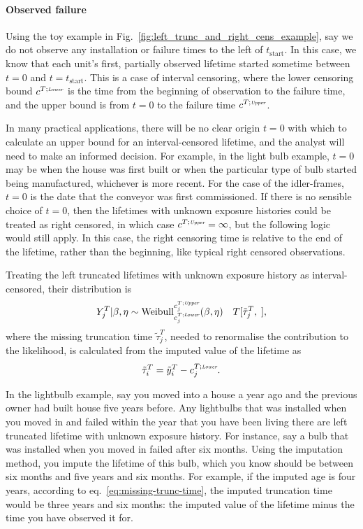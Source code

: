 \paragraph*{Observed failure}
Using the toy example in Fig.~\ref{fig:left_trunc_and_right_cens_example}, say we do not observe any installation or failure times to the left of $t_\text{start}$. In this case, we know that each unit's first, partially observed lifetime started sometime between $t = 0$ and $t = t_\text{start}$. This is a case of interval censoring, where the lower censoring bound $c^{T;\textit{\tiny{Lower}}}$ is the time from the beginning of observation to the failure time, and the upper bound is from $t = 0$ to the failure time $c^{T;\textit{\tiny{Upper}}}$.

In many practical applications, there will be no clear origin $t = 0$ with which to calculate an upper bound for an interval-censored lifetime, and the analyst will need to make an informed decision. For example, in the light bulb example, $t = 0$ may be when the house was first built or when the particular type of bulb started being manufactured, whichever is more recent. For the case of the idler-frames, $t = 0$ is the date that the conveyor was first commissioned. If there is no sensible choice of $t = 0$, then the lifetimes with unknown exposure histories could be treated as right censored, in which case $c^{T;\textit{\tiny{Upper}}} = \infty$, but the following logic would still apply. In this case, the right censoring time is relative to the end of the lifetime, rather than the beginning, like typical right censored observations.

Treating the left truncated lifetimes with unknown exposure history as interval-censored, their distribution is
\begin{equation}
    Y^T_j|\beta, \eta \sim \hbox{Weibull}^{c^{T;\textit{\tiny{Upper}}}_{j}}_{c^{T;\textit{\tiny{Lower}}}_{j}}(\beta, \eta) \quad T[\tilde{\tau}^{T}_j, \;],
\end{equation}
where the missing truncation time $\tilde{\tau}^{T}_j$, needed to renormalise the contribution to the likelihood, is calculated from the imputed value of the lifetime as
\begin{equation}
    \label{eq:missing-trunc-time}
   \tilde{\tau}^T_i = \tilde{y}^T_i - c^{T;\textit{\tiny{Lower}}}_{j}.
\end{equation}

In the lightbulb example, say you moved into a house a year ago and the previous owner had built house five years before. Any lightbulbs that was installed when you moved in and failed within the year that you have been living there are left truncated lifetime with unknown exposure history. For instance, say a bulb that was installed when you moved in failed after six months. Using the imputation method, you impute the lifetime of this bulb, which you know should be between six months and five years and six months. For example, if the imputed age is four years, according to eq.~\eqref{eq:missing-trunc-time}, the imputed truncation time would be three years and six months: the imputed value of the lifetime minus the time you have observed it for.

